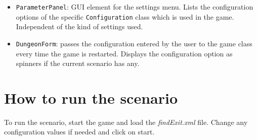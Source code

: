 \documentclass[a4paper,10pt]{scrartcl}
\begin{document}
\begin{itemize}
\item \verb|ParameterPanel|: GUI element for the settings menu. Lists the configuration options of the specific \verb|Configuration| class which is used in the game. Independent of the kind of settings used.
\item \verb|DungeonForm|: passes  the configuration entered by the user to the game class every time the game is restarted. Displays the configuration option as spinners if the current scenario has any.
\end{itemize}


\section{How to run the scenario}\label{sec:instructions}
To run the scenario, start the game and load the \textit{findExit.xml} file. Change any configuration values if needed and click on start.  
\end{document}
